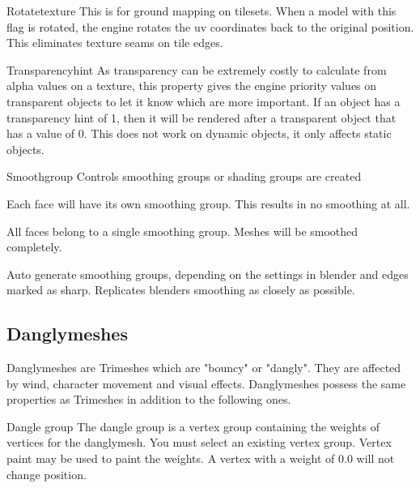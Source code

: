 \begin{propertyAurora}{Rotatetexture}
This is for ground mapping on tilesets. When a model with
this flag is rotated, the engine rotates the uv coordinates back 
to the original position. This eliminates texture seams on tile edges.
\end{propertyAurora}

\begin{propertyAurora}{Transparencyhint}
As transparency can be extremely costly to calculate from alpha values on a
texture, this property gives the engine priority values on transparent objects to let it
know which are more important. If an object has a transparency hint of 1, then it
will be rendered after a transparent object that has a value of 0. This does not work 
on dynamic objects, it only affects static objects.
\end{propertyAurora}

\begin{propertyAurora}{Smoothgroup}
Controls smoothing groups or shading groups are created
\begin{description}[leftmargin=6em,style=nextline]
    \item[Separate] Each face will have its own smoothing group. This results in no smoothing at all.
    \item[Single] All faces belong to a single smoothing group. Meshes will be smoothed completely.
    \item[Auto] Auto generate smoothing groups, depending on the settings in blender and edges marked as sharp. Replicates blenders smoothing as closely as possible.
\end{description}
\end{propertyAurora}

\subsection{Danglymeshes}

Danglymeshes are Trimeshes which are "bouncy" or "dangly". They are affected by
wind, character movement and visual effects. Danglymeshes possess the same 
properties as Trimeshes in addition to the following ones.

\begin{propertyAurora}{Dangle group} 
The dangle group is a vertex group containing the weights of vertices for the danglymesh. 
You must select an existing vertex group. Vertex paint may be used to paint the weights. A vertex with a weight of
0.0 will not change position.
\end{propertyAurora}

